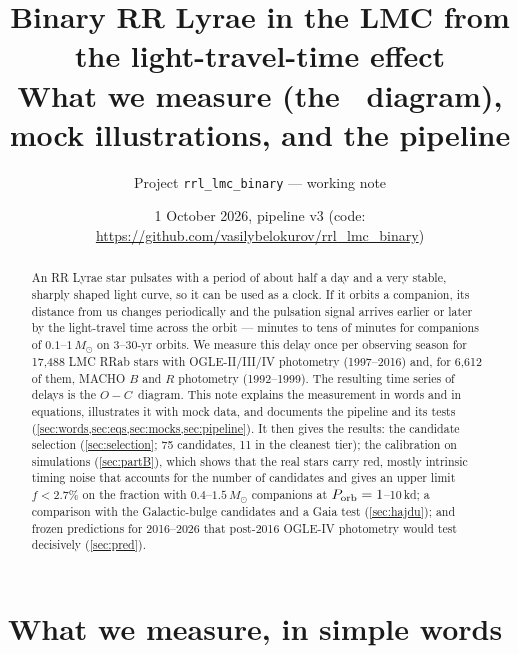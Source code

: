 \documentclass[11pt]{article}
\title{\bf Binary RR Lyrae in the LMC from the light-travel-time effect\\
\large What we measure (the \OC\ diagram), mock illustrations, and the pipeline}
\author{Project \texttt{rrl\_lmc\_binary} --- working note}
\date{1 October 2026, pipeline v3 (code: \url{https://github.com/vasilybelokurov/rrl_lmc_binary})}
\newcommand{\Msun}{\ensuremath{M_\odot}}
\newcommand{\OC}{\ensuremath{O{-}C}}
\begin{document}
\maketitle

\begin{abstract}
An RR Lyrae star pulsates with a period of about half a day and a very stable, sharply shaped light curve, so it
can be used as a clock. If it orbits a companion, its distance from us changes periodically and the pulsation
signal arrives earlier or later by the light-travel time across the orbit --- minutes to tens of minutes for
companions of $0.1$--$1\,\Msun$ on 3--30-yr orbits. We measure this delay once per observing season for
17{,}488 LMC RRab stars with OGLE-II/III/IV photometry (1997--2016) and, for 6{,}612 of them, MACHO $B$ and $R$ photometry
(1992--1999). The resulting time series of delays is the \OC\ diagram. This note explains the measurement in
words and in equations, illustrates it with mock data, and documents the pipeline and its tests (\cref{sec:words,sec:eqs,sec:mocks,sec:pipeline}).
It then gives the results: the candidate selection (\cref{sec:selection}; 75 candidates, 11 in the cleanest tier); the calibration
on simulations (\cref{sec:partB}), which shows that the real stars carry red, mostly intrinsic timing noise that accounts for
the number of candidates and gives an upper limit $f<2.7\%$ on the fraction with $0.4$--$1.5\,\Msun$ companions at
$P_{\rm orb}=1$--10\,kd; a comparison with the Galactic-bulge candidates and a Gaia test (\cref{sec:hajdu}); and frozen
predictions for 2016--2026 that post-2016 OGLE-IV photometry would test decisively (\cref{sec:pred}).
\end{abstract}

\tableofcontents

\section{What we measure, in simple words}\label{sec:words}
\end{document}
